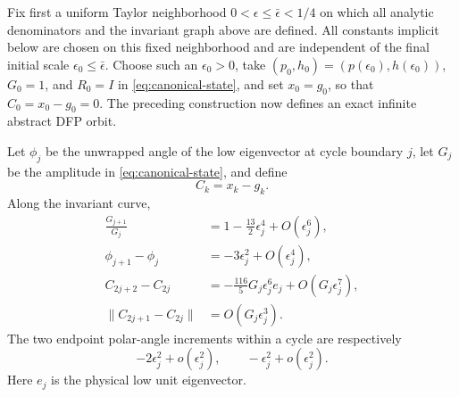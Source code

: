 \documentclass[smallextended,envcountsame]{svjour3}
\begin{document}
Fix first a uniform Taylor neighborhood
$0<\epsilon\le\bar\epsilon<1/4$ on which all analytic denominators and the
invariant graph above are defined.  All constants implicit below are chosen
on this fixed neighborhood and are independent of the final initial scale
$\epsilon_0\le\bar\epsilon$.  Choose such an $\epsilon_0>0$, take
$(p_0,h_0)=(p(\epsilon_0),h(\epsilon_0))$, $G_0=1$, and $R_0=I$ in
\eqref{eq:canonical-state}, and set $x_0=g_0$, so that $C_0=x_0-g_0=0$.
The preceding construction now defines an exact infinite abstract DFP orbit.

\begin{lemma}\label{lem:physical-drift}
Let $\phi_j$ be the unwrapped angle of the low eigenvector at cycle boundary
$j$, let $G_j$ be the amplitude in \eqref{eq:canonical-state}, and define
\[
C_k=x_k-g_k.
\]
Along the invariant curve,
\begin{align}
\frac{G_{j+1}}{G_j}
&=1-\frac{13}{2}\epsilon_j^4+O(\epsilon_j^6),
\label{eq:G-map}\\
\phi_{j+1}-\phi_j
&=-3\epsilon_j^2+O(\epsilon_j^4),
\label{eq:phi-map}\\
C_{2j+2}-C_{2j}
&=-\frac{116}{5}G_j\epsilon_j^6e_j
+O(G_j\epsilon_j^7),
\label{eq:C-map}\\
\|C_{2j+1}-C_{2j}\|&=O(G_j\epsilon_j^3).
\label{eq:C-half}
\end{align}
The two endpoint polar-angle increments within a cycle are respectively
\begin{equation}\label{eq:half-angles}
-2\epsilon_j^2+o(\epsilon_j^2),
\qquad -\epsilon_j^2+o(\epsilon_j^2).
\end{equation}
Here $e_j$ is the physical low unit eigenvector.
\end{lemma}
\end{document}
